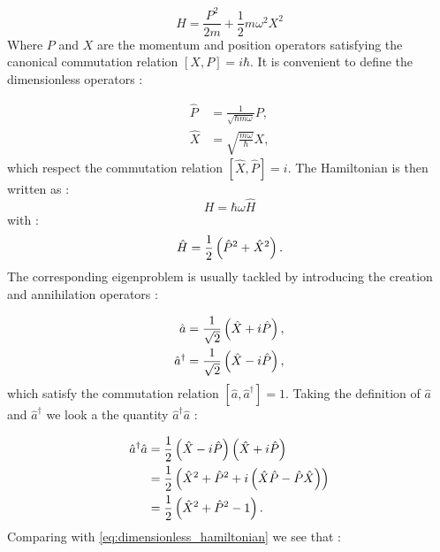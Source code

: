 \begin{equation}
    H=\frac{P^2}{2m}+\frac{1}{2}m\omega^2X^2
\end{equation}
Where $P$ and $X$ are the momentum and position operators satisfying the canonical commutation relation $[X,P]=i\hbar$.
It is convenient to define the dimensionless operators :

\begin{subequations}
    \begin{align}
        \hat{P}&=\frac{1}{\sqrt{\hbar m\omega}}P,\\
        \hat{X}&=\sqrt{\frac{m\omega}{\hbar}}X, 
    \end{align}
\end{subequations}
which respect the commutation relation $[\hat{X},\hat{P}]=i$. The Hamiltonian is then written as :
\begin{equation}
    H=\hbar\omega\hat{H}
\end{equation}
with :
\begin{equation}
    \label{eq:dimensionless_hamiltonian}
    \hat{H}=\frac{1}{2}\left(\hat{P}^2+\hat{X}^2\right).
\end{equation}
The corresponding eigenproblem is usually tackled by introducing the creation and annihilation operators :

\begin{subequations}
    \begin{align}
        \hat{a}&=\frac{1}{\sqrt{2}}\left(\hat{X}+i\hat{P}\right),\\
        \hat{a}^\dagger&=\frac{1}{\sqrt{2}}\left(\hat{X}-i\hat{P}\right),
    \end{align}
\end{subequations}
which satisfy the commutation relation $[\hat{a},\hat{a}^\dagger]=1$.
Taking the definition of $\hat{a}$ and $\hat{a}^\dagger$ we look a the quantity $\hat{a}^\dagger\hat{a}$ :

\begin{equation}
    \begin{align}
    \hat{a}^\dagger\hat{a}&=\frac{1}{2}\left(\hat{X}-i\hat{P}\right)\left(\hat{X}+i\hat{P}\right) \\
                          &=\frac{1}{2}\left(\hat{X}^2+\hat{P}^2+i\left(\hat{X}\hat{P}-\hat{P}\hat{X}\right)\right) \\
                          &=\frac{1}{2}\left(\hat{X}^2+\hat{P}^2-1\right).
    \end{align}
\end{equation}
Comparing with \autoref{eq:dimensionless_hamiltonian} we see that :

